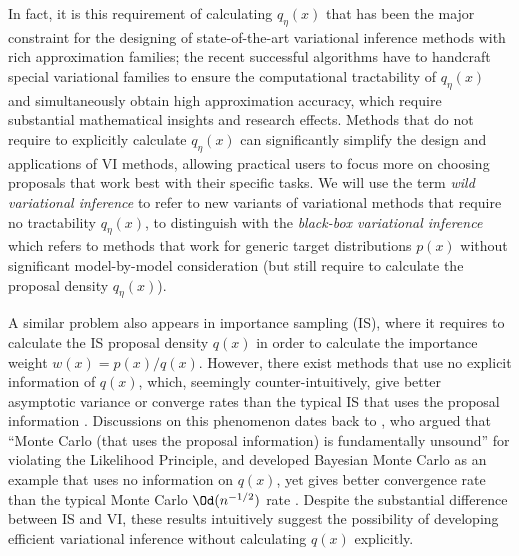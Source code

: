 \documentclass{article} \usepackage{iclr2017_conference,times}
\begin{document}
In fact, it is this requirement of calculating $q_\eta(x)$ 
that has been the major constraint for the designing of state-of-the-art variational inference methods with rich approximation families; 
the recent successful algorithms \citep[e.g.,][to name only a few]{rezende2015variational,tran2015variational,ranganath2015hierarchical} 
have to handcraft special variational families 
to ensure the computational tractability of $q_\eta(x)$ and simultaneously obtain high approximation accuracy, 
which require substantial mathematical insights and research effects. 
Methods that do not require to explicitly calculate $q_\eta(x)$ 
can significantly simplify the design and applications of VI methods, 
allowing practical users to focus more on choosing proposals that work best with their specific tasks. We will use the term \emph{wild variational inference} to refer to new variants of variational methods that require no tractability $q_\eta(x)$, to distinguish with the \emph{black-box variational inference} \citep{ranganath2013black}
which refers to methods that work for generic target distributions $p(x)$ without significant model-by-model consideration (but still require to calculate the proposal density $q_\eta(x)$). 

A similar problem also appears in importance sampling (IS), 
where it requires to calculate the IS proposal density $q(x)$ in order to calculate the importance weight $w(x) = p(x)/q(x)$. 
However, there exist methods that use no explicit information of $q(x)$, which, seemingly counter-intuitively, give better asymptotic variance or converge rates than the typical IS that uses the proposal information \citep[e.g.,][]{liu2016black, briol2015probabilistic, henmi2007importance, delyon2014integral}.
Discussions on this phenomenon dates back to \citet{o1987monte}, who 
argued that ``Monte Carlo (that uses the proposal information) is fundamentally unsound'' for violating the Likelihood Principle, 
and developed Bayesian Monte Carlo \citep{o1991bayes} as 
an example that uses no information on $q(x)$, yet gives better convergence rate than the typical Monte Carlo $\Od(n^{-1/2})$ rate \citep{briol2015probabilistic}. 
Despite the substantial difference between IS and VI, 
these results intuitively suggest the possibility of developing efficient variational inference without calculating $q(x)$ explicitly. 
\end{document}
